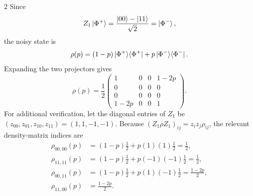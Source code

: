 \documentclass[a4paper,10pt]{article}
\begin{document}
\begin{multicols}{2}
Since
\begin{equation}
Z_1\ket{\Phi^+}=\frac{\ket{00}-\ket{11}}{\sqrt{2}}
=\ket{\Phi^-},
\end{equation}
the noisy state is
\begin{equation}
\rho(p)=(1-p)\ket{\Phi^+}\!\bra{\Phi^+}
+p\ket{\Phi^-}\!\bra{\Phi^-}.
\end{equation}
Expanding the two projectors gives
\begin{equation}
\rho(p)=\frac12\begin{pmatrix}
1&0&0&1-2p\\
0&0&0&0\\
0&0&0&0\\
1-2p&0&0&1
\end{pmatrix}. \label{eq:rho-p}
\end{equation}
For additional verification, let the diagonal entries of $Z_1$ be
$(z_{00},z_{01},z_{10},z_{11})=(1,1,-1,-1)$.  Because
$(Z_1\rho Z_1)_{ij}=z_i z_j\rho_{ij}$, the relevant density-matrix indices are
\begin{align}
\rho_{00,00}(p)&=(1-p)\frac12+p(1)(1)\frac12=\frac12,\\
\rho_{11,11}(p)&=(1-p)\frac12+p(-1)(-1)\frac12=\frac12,\\
\rho_{00,11}(p)&=(1-p)\frac12+p(1)(-1)\frac12=\frac{1-2p}{2},\\
\rho_{11,00}(p)&=\frac{1-2p}{2}. \label{eq:index-elements}
\end{align}


\end{multicols}
\end{document}
